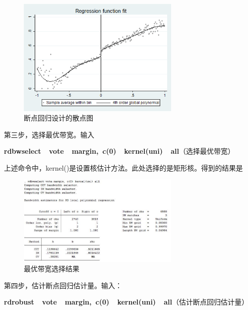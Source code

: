 \documentclass[cn,10pt,math=newtx,citestyle=gb7714-2015,bibstyle=gb7714-2015]{elegantbook}
\begin{document}
	\begin{figure}[htbp]
		\centering
		\includegraphics[width=0.7\textwidth]{rdgraph.png}
		\caption{断点回归设计的散点图}\label{fig:digit}
	\end{figure}
	
	第三步，选择最优带宽。输入
	
	\textbf{rdbwselect~~vote~~margin,~c(0)~~kernel(uni)~~all}（选择最优带宽）
	
	上述命令中，kernel()是设置核估计方法。此处选择的是矩形核。得到的结果是
	
	\begin{figure}[htbp]
		\centering
		\includegraphics[width=0.7\textwidth]{rdbw.jpg}
		\caption{最优带宽选择结果}\label{fig:digit}
	\end{figure}
	
	第四步，估计断点回归估计量。输入：
	
	\textbf{rdrobust~~vote~~margin,~c(0)~~kernel(uni)~~all}（估计断点回归估计量）
	
\end{document}

